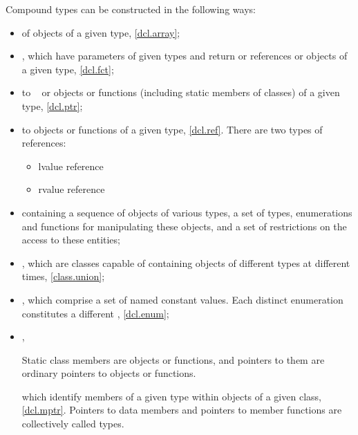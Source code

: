 \pnum
{}%
Compound types can be constructed in the following ways:
\begin{itemize}
\item {} of objects of a given type, \ref{dcl.array};

\item {}, which have parameters of given types and return
 or references or objects of a given type, \ref{dcl.fct};

\item {} to \cv{}~ or objects or functions (including
static members of classes) of a given type, \ref{dcl.ptr};

\item
{}%
%
 to objects or functions of a given
type, \ref{dcl.ref}. There are two types of references:
\begin{itemize}
\item lvalue reference
\item rvalue reference
\end{itemize}

\item
{} containing a sequence of objects of various types,
a set of types, enumerations and functions for
manipulating these objects, and a set of restrictions
on the access to these entities;

\item
{}, which are classes capable of containing objects of
different types at different times, \ref{class.union};

\item
{}, which comprise a set of named constant values.
Each distinct enumeration constitutes a different
, \ref{dcl.enum};

\item
{}%
,%
\begin{footnote}
Static class members are objects or functions, and pointers to them are
ordinary pointers to objects or functions.
\end{footnote}
which identify members of a given
type within objects of a given class, \ref{dcl.mptr}.
Pointers to data members and pointers to member functions are collectively
called  types.
\end{itemize}


